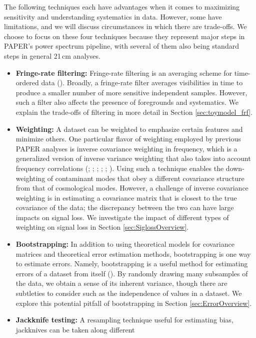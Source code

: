 \documentclass[preprint2,numberedappendix,tighten]{aastex6}  %
\begin{document}
The following techniques each have advantages when it comes to maximizing sensitivity and understanding systematics in 
data. However, some have limitations, and we will discuss circumstances in which there are trade-offs. We choose to focus on 
these four techniques because they represent major steps in PAPER's power spectrum pipeline, with several of them also 
being standard steps in general 21\,cm analyses.
\begin{itemize}
\item \textbf{Fringe-rate filtering:} Fringe-rate filtering is an averaging scheme for time-ordered data 
(\citealt{parsons_et_al2016}). Broadly, a fringe-rate filter averages visibilities in time to produce a smaller number of more sensitive 
independent samples. However, such a filter also affects the presence 
of foregrounds and systematics. We explain the trade-offs of filtering in more detail in Section \ref{sec:toymodel_frf}.
\item \textbf{Weighting:} A dataset can be weighted to emphasize certain features and minimize others. One particular flavor of 
weighting employed by previous PAPER analyses is inverse covariance weighting in frequency, which is a generalized version of inverse variance 
weighting that also takes into account frequency correlations (\citealt{liu_tegmark2011}; \citealt{dillon_et_al2013a}; \citealt{liu_et_al2014a}; \citealt{liu_et_al2014b}; \citealt{dillon_et_al2014}; \citealt{dillon_et_al2015}). Using such a technique enables the down-weighting of contaminant modes that obey a different covariance structure from that of cosmological modes. However, a challenge of inverse covariance 
weighting is in estimating a covariance matrix that is closest to the true covariance of the data; the discrepancy between the two can have large impacts on signal loss. We investigate the impact of different types of weighting on signal loss in Section \ref{sec:SiglossOverview}.
\item \textbf{Bootstrapping:} In addition to using theoretical models for covariance matrices and theoretical error estimation 
methods, bootstrapping is one way to estimate errors. Namely, bootstrapping is a useful method for estimating errors of a dataset from 
itself (\citealt{andrae2010}). By randomly drawing many subsamples of the data, we obtain a sense of its inherent variance, though there are subtleties to 
consider such as the independence of values in a dataset. We explore this potential pitfall of bootstrapping in Section \ref{sec:ErrorOverview}.
\item \textbf{Jackknife testing:} A resampling technique useful for estimating bias, jackknives can be taken along different 

\end{itemize}
\end{document}
